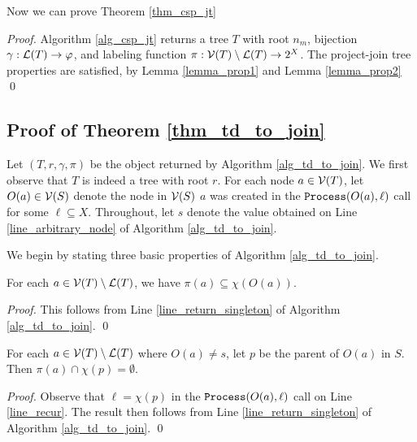 Now we can prove Theorem \ref{thm_csp_jt}
\begin{proof}
    Algorithm \ref{alg_csp_jt} returns a tree $T$ with root $n_m$, bijection $\gamma : \mathcal{L}(T) \to \varphi$, and labeling function $\pi : \mathcal{V}(T) \setminus \mathcal{L}(T) \to 2^X$.
    The project-join tree properties are satisfied, by Lemma \ref{lemma_prop1} and Lemma \ref{lemma_prop2}
\qed
\end{proof}


\subsection{Proof of Theorem \ref{thm_td_to_join}}

Let $(T, r, \gamma, \pi)$ be the object returned by Algorithm \ref{alg_td_to_join}.
We first observe that $T$ is indeed a tree with root $r$.
For each node $a \in \mathcal{V}(T)$, let $O(a) \in \mathcal{V}(S)$ denote the node in $\mathcal{V}(S)$ \st{} $a$ was created in the $\texttt{\upshape Process}(O(a), \ell)$ call for some $\ell \subseteq X$.
Throughout, let $s$ denote the value obtained on Line \ref{line_arbitrary_node} of Algorithm \ref{alg_td_to_join}.

We begin by stating three basic properties of Algorithm \ref{alg_td_to_join}.
\begin{lemma}
\label{lem:td-label}
    For each $a \in \mathcal{V}(T) \setminus \mathcal{L}(T)$, we have $\pi(a) \subseteq \chi(O(a))$.
\end{lemma}
\begin{proof}
    This follows from Line \ref{line_return_singleton} of Algorithm \ref{alg_td_to_join}.
\qed
\end{proof}

\begin{lemma}
\label{lem:td-parent}
    For each $a \in \mathcal{V}(T) \setminus \mathcal{L}(T)$ where $O(a) \neq s$, let $p$ be the parent of $O(a)$ in $S$.
    Then $\pi(a) \cap \chi(p) = \emptyset$.
\end{lemma}
\begin{proof}
    Observe that $\ell = \chi(p)$ in the $\texttt{\upshape Process}(O(a), \ell)$ call on Line \ref{line_recur}.
    The result then follows from Line \ref{line_return_singleton} of Algorithm \ref{alg_td_to_join}.
\qed
\end{proof}


